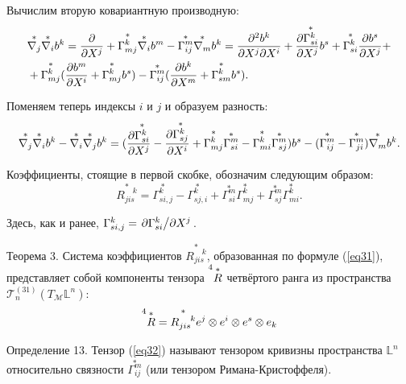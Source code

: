 \documentclass[14pt,a4paper]{extarticle}
\begin{document}
Вычислим вторую ковариантную производную:
\begin{align}\label{eq29}
\begin{split}
	&\overset{*}{\nabla_j} \overset{*}{\nabla_i} b^k = \pdv{}{X^j} (\overset{*}{\nabla_i}b^k) + \overset{*}{\Gamma_{mj}^k} \overset{*}{\nabla_i} b^m - \overset{*}{\Gamma_{ij}^m} \overset{*}{\nabla_m} b^k = \pdv{b^k}{X^j}{X^i} + \pdv{\overset{*}{\Gamma_{si}^k}}{X^j}b^s + \overset{*}{\Gamma_{si}^k} \pdv{b^s}{X^j} +\\ &+\overset{*}{\Gamma_{mj}^k} (\pdv{b^m}{X^i} + \overset{*}{\Gamma_{mj}^k} b^s) - \overset{*}{\Gamma_{ij}^m}(\pdv{b^k}{X^m} + \overset{*}{\Gamma_{sm}^k}b^s).
\end{split}	
\end{align}

Поменяем теперь индексы $i$ и $j$ и образуем разность:
\begin{equation}\label{eq30}
	\overset{*}{\nabla_j} \overset{*}{\nabla_i} b^k - \overset{*}{\nabla_i} \overset{*}{\nabla_j} b^k = (\pdv{\overset{*}{\Gamma_{si}^k}}{X^j} - \pdv{\overset{*}{\Gamma_{sj}^k}}{X^i} + \overset{*}{\Gamma_{mj}^k} \overset{*}{\Gamma_{si}^m} - \overset{*}{\Gamma_{mi}^k} \overset{*}{\Gamma_{sj}^m})b^s - (\overset{*}{\Gamma_{ij}^m} - \overset{*}{\Gamma_{ji}^m}) \overset{*}{\nabla_m}b^k.
\end{equation}


Коэффициенты, стоящие в первой скобке, обозначим следующим образом:
\begin{equation}\label{eq31}
	\overset{*}{R_{jis}^{\quad k}} = \overset{*}{\Gamma_{si,j}^k} - \overset{*}{\Gamma_{sj,i}^k} + \overset{*}{\Gamma_{si}^m} \overset{*}{\Gamma_{mj}^k} + \overset{*}{\Gamma_{sj}^m} \overset{*}{\Gamma_{mi}^k}.
\end{equation}

Здесь, как и ранее, $\Gamma_{si,j}^k = \pdv*{\Gamma_{si}^k}{X^j}$.


Теорема 3. Система коэффициентов $\overset{*}{R_{jis}^{\quad k}}$, образованная по формуле (\ref{eq31}), представляет собой компоненты тензора $\prescript{4}{}{\overset{*}{R}}$ четвёртого ранга из пространства $\mathcal{T}_n^{(31)} (T_\mathcal{M} \mathbb{L}^n)$:
\begin{equation}\label{eq32}
	\prescript{4}{}{\overset{*}{R}} = \overset{*}{R_{jis}^{\quad k}} e^j \otimes e^i \otimes e^s \otimes e_k
\end{equation}


Определение 13. Тензор (\ref{eq32}) называют тензором кривизны пространства $\mathbb{L}^n$ относительно связности $\overset{*}{\Gamma_{ij}^m}$ (или тензором Римана-Кристоффеля).
\end{document}
